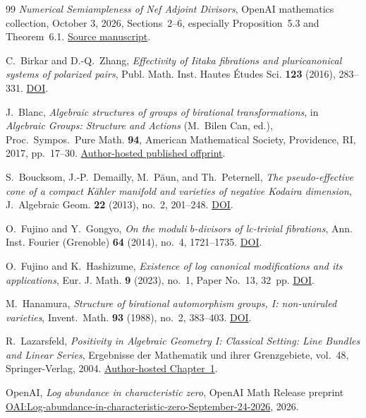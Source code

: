 \documentclass[12pt,a4paper,psamsfonts]{amsart}
\theoremstyle{definition}
\theoremstyle{plain}
\begin{document}
\begin{thebibliography}{99}
\emph{Numerical Semiampleness of Nef Adjoint Divisors},
OpenAI mathematics collection, October 3, 2026,
Sections~2--6, especially Proposition~5.3 and Theorem~6.1.
\href{https://github.com/openai/math/blob/main/preprints/Numerical-Semiampleness-of-Nef-Adjoint-Divisors-October-3-2026/paper.pdf}{Source manuscript}.

C.~Birkar and D.-Q.~Zhang,
\emph{Effectivity of Iitaka fibrations and pluricanonical systems of polarized pairs},
Publ. Math. Inst. Hautes \'Etudes Sci. \textbf{123} (2016), 283--331.
\href{https://doi.org/10.1007/s10240-016-0080-x}{DOI}.

J.~Blanc,
\emph{Algebraic structures of groups of birational transformations},
in \emph{Algebraic Groups: Structure and Actions} (M.~Bilen Can, ed.),
Proc.~Sympos.~Pure Math. \textbf{94}, American Mathematical Society,
Providence, RI, 2017, pp.~17--30.
\href{https://algebra.dmi.unibas.ch/blanc/articles/structurebir.pdf}{Author-hosted published offprint}.

S.~Boucksom, J.-P.~Demailly, M.~P\u{a}un, and Th.~Peternell,
\emph{The pseudo-effective cone of a compact K\"ahler manifold and varieties of negative Kodaira dimension},
J.~Algebraic Geom. \textbf{22} (2013), no.~2, 201--248.
\href{https://doi.org/10.1090/S1056-3911-2012-00574-8}{DOI}.

O.~Fujino and Y.~Gongyo,
\emph{On the moduli $b$-divisors of lc-trivial fibrations},
Ann. Inst. Fourier (Grenoble) \textbf{64} (2014), no.~4, 1721--1735.
\href{https://doi.org/10.5802/aif.2894}{DOI}.

O.~Fujino and K.~Hashizume,
\emph{Existence of log canonical modifications and its applications},
Eur. J. Math. \textbf{9} (2023), no.~1, Paper No.~13, 32~pp.
\href{https://doi.org/10.1007/s40879-023-00598-0}{DOI}.

M.~Hanamura,
\emph{Structure of birational automorphism groups, I: non-uniruled varieties},
Invent.~Math. \textbf{93} (1988), no.~2, 383--403.
\href{https://doi.org/10.1007/BF01394338}{DOI}.

R.~Lazarsfeld,
\emph{Positivity in Algebraic Geometry I: Classical Setting: Line Bundles and Linear Series},
Ergebnisse der Mathematik und ihrer Grenzgebiete, vol.~48,
Springer-Verlag, 2004.
\href{https://www.math.stonybrook.edu/~roblaz/Reprints/Laz.PAG.Chapt1.pdf}{Author-hosted Chapter~1}.

OpenAI,
\emph{Log abundance in characteristic zero},
OpenAI Math Release preprint
\href{https://github.com/openai/math/blob/main/preprints/Log-abundance-in-characteristic-zero-September-24-2026/paper.pdf}{OAI:Log-abundance-in-characteristic-zero-September-24-2026},
2026.
\end{thebibliography}
\end{document}
